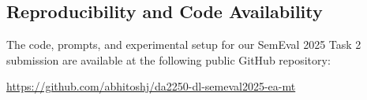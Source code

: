 \documentclass{ecai}
\begin{document}
\subsection{Reproducibility and Code Availability}

The code, prompts, and experimental setup for our SemEval 2025 Task 2 submission are available at the following public GitHub repository:

\begin{center}
\url{https://github.com/abhitoshj/da2250-dl-semeval2025-ea-mt}
\end{center}
\end{document}
